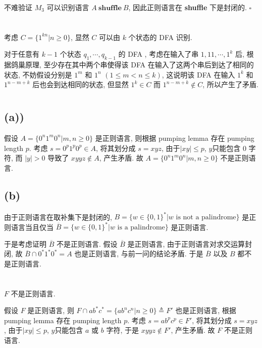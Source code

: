 \documentclass[8pt]{article}
\theoremstyle{compact}
\def\le{\leqslant}
\def\ge{\geqslant}
\begin{document}
	不难验证 $M_3$ 可以识别语言 $A\ \textbf{shuffle}\ B$, 因此正则语言在 \textbf{shuffle} 下是封闭的. \hfill $\square$ 

\section{}
	考虑 $C = \{1^{kn} | n \ge 0\}$, 显然 $C$ 可以由 $k$ 个状态的 DFA 识别. 

	对于任意有 $k-1$ 个状态 $q_1, \cdots, q_{k-1}$ 的 DFA , 考虑在输入了串 $1, 11, \cdots, 1^{k}$ 后, 根据鸽巢原理, 至少存在其中两个串使得该 DFA 在输入了这两个串后到达了相同的状态, 不妨假设分别是 $1^m$ 和 $1^n$ $(1 \le m < n \le k)$, 这说明该 DFA 在输入 $1^k$ 和 $1^{n-m+k}$ 后也会到达相同的状态, 但显然 $1^k \in C$ 而 $1^{n-m+k} \notin C$, 所以产生了矛盾.
\section{}
\subsection*{(a))}
	假设 $A = \{0^n1^m0^n | m, n \ge 0\}$ 是正则语言, 则根据 pumping lemma 存在 pumping length $p$. 考虑 $s = 0^p1^p0^p \in A$, 将其划分成 $s = xyz$, 由于$|xy| \le p$, $y$只能包含 $0$ 字符, 而 $|y| > 0$ 导致了 $xyyz \notin A$, 产生矛盾. 故 $A = \{0^n1^m0^n | m, n \ge 0\}$ 不是正则语言.
\subsection*{(b)}
	由于正则语言在取补集下是封闭的, $B = \{w \in \{0, 1\}^*| w \text{ is not a palindrome}\}$ 是正则语言当且仅当 $\overline{B} = \{w \in \{0, 1\}^*| w \text{ is a palindrome}\}$ 是正则语言.

	于是考虑证明 $\overline{B}$ 不是正则语言. 假设 $\overline{B}$ 是正则语言, 由于正则语言对求交运算封闭, 故 $\overline{B} \cap 0^*1^*0^* = A$ 也是正则语言, 与前一问的结论矛盾. 于是 $\overline{B}$ 以及 $B$ 都不是正则语言.

\section{}
	$F$ 不是正则语言.

	假设 $F$ 是正则语言, 则 $F \cap ab^*c^* = \{ab^nc^n | n \ge 0\} \triangleq F'$ 也是正则语言, 根据 pumping lemma 存在 pumping length $p$. 考虑 $s = ab^pc^p \in F'$, 将其划分成 $s = xyz$, 由于$|xy| \le p$, $y$只能包含 $a$ 或 $b$ 字符, 于是 $xyyz \notin F'$, 产生矛盾. 故 $F$ 不是正则语言. 
\end{document}
